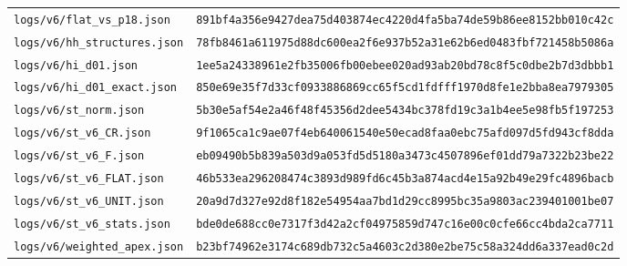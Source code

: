 \documentclass[11pt,a4paper]{article}
\newcommand{\loc}[1]{\nolinkurl{#1}}
\theoremstyle{plain}
\theoremstyle{definition}
\theoremstyle{remark}
\numberwithin{equation}{section}
\begin{document}
\begin{longtable}{@{}L{.50\linewidth}L{.44\linewidth}@{}}
{\footnotesize\loc{logs/v6/flat_vs_p18.json}} & \texttt{\scriptsize 891bf4a356e9427dea75d403874ec422}\newline\texttt{\scriptsize 0d4fa5ba74de59b86ee8152bb010c42c}\\
{\footnotesize\loc{logs/v6/hh_structures.json}} & \texttt{\scriptsize 78fb8461a611975d88dc600ea2f6e937}\newline\texttt{\scriptsize b52a31e62b6ed0483fbf721458b5086a}\\
{\footnotesize\loc{logs/v6/hi_d01.json}} & \texttt{\scriptsize 1ee5a24338961e2fb35006fb00ebee02}\newline\texttt{\scriptsize 0ad93ab20bd78c8f5c0dbe2b7d3dbbb1}\\
{\footnotesize\loc{logs/v6/hi_d01_exact.json}} & \texttt{\scriptsize 850e69e35f7d33cf0933886869cc65f5}\newline\texttt{\scriptsize cd1fdfff1970d8fe1e2bba8ea7979305}\\
{\footnotesize\loc{logs/v6/st_norm.json}} & \texttt{\scriptsize 5b30e5af54e2a46f48f45356d2dee543}\newline\texttt{\scriptsize 4bc378fd19c3a1b4ee5e98fb5f197253}\\
{\footnotesize\loc{logs/v6/st_v6_CR.json}} & \texttt{\scriptsize 9f1065ca1c9ae07f4eb640061540e50e}\newline\texttt{\scriptsize cad8faa0ebc75afd097d5fd943cf8dda}\\
{\footnotesize\loc{logs/v6/st_v6_F.json}} & \texttt{\scriptsize eb09490b5b839a503d9a053fd5d5180a}\newline\texttt{\scriptsize 3473c4507896ef01dd79a7322b23be22}\\
{\footnotesize\loc{logs/v6/st_v6_FLAT.json}} & \texttt{\scriptsize 46b533ea296208474c3893d989fd6c45}\newline\texttt{\scriptsize b3a874acd4e15a92b49e29fc4896bacb}\\
{\footnotesize\loc{logs/v6/st_v6_UNIT.json}} & \texttt{\scriptsize 20a9d7d327e92d8f182e54954aa7bd1d}\newline\texttt{\scriptsize 29cc8995bc35a9803ac239401001be07}\\
{\footnotesize\loc{logs/v6/st_v6_stats.json}} & \texttt{\scriptsize bde0de688cc0e7317f3d42a2cf049758}\newline\texttt{\scriptsize 59d747c16e00c0cfe66cc4bda2ca7711}\\
{\footnotesize\loc{logs/v6/weighted_apex.json}} & \texttt{\scriptsize b23bf74962e3174c689db732c5a4603c}\newline\texttt{\scriptsize 2d380e2be75c58a324dd6a337ead0c2d}\\

\end{longtable}
\end{document}
